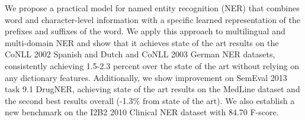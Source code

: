 We propose a practical model for named entity recognition (NER) that combines word and character-level information with a specific learned representation of the prefixes and suffixes of the word. We apply this approach to multilingual and multi-domain NER and show that it achieves state of the art results on the CoNLL 2002 Spanish and Dutch and CoNLL 2003 German NER datasets, consistently achieving 1.5-2.3 percent over the state of the art without relying on any dictionary features. Additionally, we show improvement on SemEval 2013 task 9.1 DrugNER, achieving state of the art results on the MedLine dataset and the second best results overall (-1.3\% from state of the art). We also establish a new benchmark on the I2B2 2010 Clinical NER dataset with 84.70 F-score.
